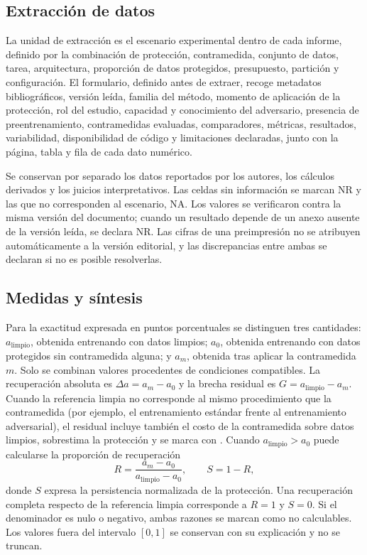 \documentclass[pdflatex,sn-mathphys-num]{sn-jnl}
\theoremstyle{thmstyleone}
\theoremstyle{thmstyletwo}
\theoremstyle{thmstylethree}
\begin{document}
\subsection{Extracción de datos}

La unidad de extracción es el escenario experimental dentro de cada informe, definido por la combinación de protección, contramedida, conjunto de datos, tarea, arquitectura, proporción de datos protegidos, presupuesto, partición y configuración. El formulario, definido antes de extraer, recoge metadatos bibliográficos, versión leída, familia del método, momento de aplicación de la protección, rol del estudio, capacidad y conocimiento del adversario, presencia de preentrenamiento, contramedidas evaluadas, comparadores, métricas, resultados, variabilidad, disponibilidad de código y limitaciones declaradas, junto con la página, tabla y fila de cada dato numérico.

Se conservan por separado los datos reportados por los autores, los cálculos derivados y los juicios interpretativos. Las celdas sin información se marcan NR y las que no corresponden al escenario, NA. Los valores se verificaron contra la misma versión del documento; cuando un resultado depende de un anexo ausente de la versión leída, se declara NR. Las cifras de una preimpresión no se atribuyen automáticamente a la versión editorial, y las discrepancias entre ambas se declaran si no es posible resolverlas.

\subsection{Medidas y síntesis}

Para la exactitud expresada en puntos porcentuales se distinguen tres cantidades: $a_{\mathrm{limpio}}$, obtenida entrenando con datos limpios; $a_0$, obtenida entrenando con datos protegidos sin contramedida alguna; y $a_m$, obtenida tras aplicar la contramedida $m$. Solo se combinan valores procedentes de condiciones compatibles. La recuperación absoluta es $\Delta a = a_m - a_0$ y la brecha residual es $G = a_{\mathrm{limpio}} - a_m$. Cuando la referencia limpia no corresponde al mismo procedimiento que la contramedida (por ejemplo, el entrenamiento estándar frente al entrenamiento adversarial), el residual incluye también el costo de la contramedida sobre datos limpios, sobrestima la protección y se marca con \textdagger. Cuando $a_{\mathrm{limpio}} > a_0$ puede calcularse la proporción de recuperación
\begin{equation}
R = \frac{a_m - a_0}{a_{\mathrm{limpio}} - a_0}, \qquad S = 1 - R,
\end{equation}
donde $S$ expresa la persistencia normalizada de la protección. Una recuperación completa respecto de la referencia limpia corresponde a $R = 1$ y $S = 0$. Si el denominador es nulo o negativo, ambas razones se marcan como no calculables. Los valores fuera del intervalo $[0,1]$ se conservan con su explicación y no se truncan.
\end{document}
